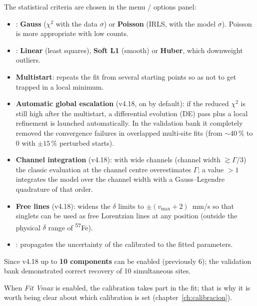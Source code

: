 The statistical criteria are chosen in the  menu / options panel:

\begin{itemize}[nosep]
  \item {}: \textbf{Gauss} ($\chi^2$ with the data $\sigma$) or
        \textbf{Poisson} (IRLS, with the model $\sigma$). Poisson is more
        appropriate with low counts.
  \item {}: \textbf{Linear} (least squares),
        \textbf{Soft L1} (smooth) or \textbf{Huber}, which downweight
        outliers.
  \item \textbf{Multistart}: repeats the fit from several starting points so as
        not to get trapped in a local minimum.
  \item \textbf{Automatic global escalation} (v4.18, on by default): if the
        reduced $\chi^2$ is still high after the multistart, a differential
        evolution (DE) pass plus a local refinement is launched automatically.
        In the validation bank it completely removed the convergence failures
        in overlapped multi-site fits (from $\sim$40\,\% to 0 with $\pm 15\,\%$
        perturbed starts).
  \item \textbf{Channel integration} (v4.18): with wide channels (channel width
        $\gtrsim \Gamma/3$) the classic evaluation at the channel centre
        overestimates $\Gamma$; a value $>1$ integrates the model over the
        channel width with a Gauss--Legendre quadrature of that order.
  \item \textbf{Free lines} (v4.18): widens the $\delta$ limits to
        $\pm(v_{\max}+2)$~mm/s so that singlets can be used as free Lorentzian
        lines at any position (outside the physical $\delta$ range of
        \textsuperscript{57}Fe).
  \item {}: propagates the uncertainty
        of the calibrated  to the fitted parameters.
\end{itemize}

\begin{nota}
Since v4.18 up to \textbf{10 components} can be enabled (previously 6); the
validation bank demonstrated correct recovery of 10 simultaneous sites.
\end{nota}

\begin{nota}
When \emph{Fit Vmax} is enabled, the calibration takes part in the fit; that
is why it is worth being clear about which calibration is set (chapter~\ref{ch:calibracion}).
\end{nota}

